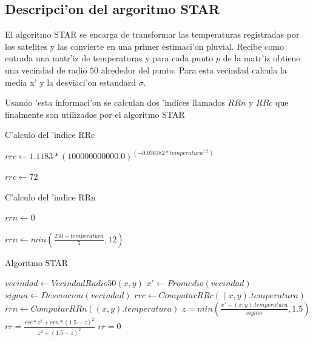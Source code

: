 \subsection{Descripci'on del argoritmo STAR}
  El algoritmo STAR\cite{star} se encarga de transformar las temperaturas registradas por los satelites y las convierte
  en una primer estimaci'on pluvial. Recibe como entrada una matr'iz de temperaturas y para cada punto $p$ de la matr'iz
  obtiene una vecindad de radio $50$ alrededor del punto. Para esta vecindad calcula la media x' y la desviaci'on estandard $\sigma$.

  Usando 'esta informaci'on se calculan dos 'indices llamados $RRn$ y $RRc$ que finalmente son utilizados por el algoritmo STAR

  \begin{algorithm}
  \caption{C'alculo del 'indice RRc}

  \begin{algorithmic}
	  \STATE $rrc \gets 1.1183* (100000000000.0)^(-0.036382*temperatura^{1.2})$
  \ELSE
	  
	  \STATE $rrc \gets 72$ 
	  
  \ENDIF 
  \end{algorithmic}
  \end{algorithm}

  \begin{algorithm}
  \caption{C'alculo del 'indice RRn}

  \begin{algorithmic}
	  \STATE $rrn \gets 0$
  \ELSE
	  
	  \STATE $rrn \gets min(\frac{250-temperatura}{5}, 12)$ 
	  
  \ENDIF 
  \end{algorithmic}
  \end{algorithm}

  \begin{algorithm}
  \caption{Algoritmo STAR}

  \begin{algorithmic}
      \STATE $vecindad \gets VecindadRadio50(x,y)$
      \STATE $x' \gets Promedio(vecindad)$
      \STATE $sigma \gets Desviacion(vecindad)$  
      \STATE $rrc \gets ComputarRRc((x,y).temperatura)$
      \STATE $rrn \gets ComputarRRn((x,y).temperatura)$
      \STATE $z = min(\frac{ x'-(x,y).temperatura}{sigma}, 1.5)$
	\STATE $rr = \frac{rrc*z^2 + rrn*(1.5-z)^2}{z^2+ (1.5-z)^2}$
      \ELSE	  
	\STATE $rr = 0$   
      \ENDIF
    \ENDFOR
  \end{algorithmic}
  \end{algorithm}

